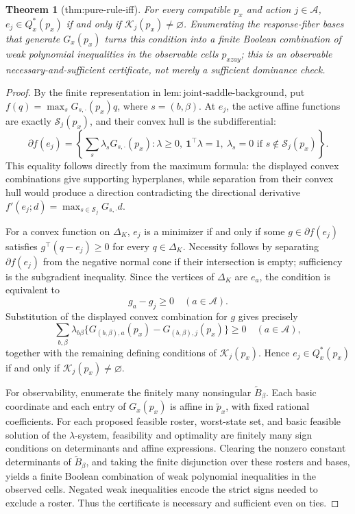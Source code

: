 \documentclass{article}
\newtheorem{theorem}{Theorem}
\begin{document}
\begin{theorem}[thm:pure-rule-iff]\label{thm:pure-rule-iff}
For every compatible \(p_x\) and action \(j\in\mathcal A\), \(e_j\in Q_x^*(p_x)\) if and only if \(\mathcal K_j(p_x)\neq\varnothing\). Enumerating the response-fiber bases that generate \(G_x(p_x)\) turns this condition into a finite Boolean combination of weak polynomial inequalities in the observable cells \(p_{xzay}\); this is an observable necessary-and-sufficient certificate, not merely a sufficient dominance check.
\end{theorem}
\begin{proof}
By the finite representation in \(\mathrm{lem{:}joint\text{-}saddle\text{-}background}\), put \(f(q)=\max_sG_{s,\cdot}(p_x)q\), where \(s=(b,\beta)\).  At \(e_j\), the active affine functions are exactly \(\mathcal S_j(p_x)\), and their convex hull is the subdifferential:
\[
 \partial f(e_j)=\left\{\sum_s\lambda_sG_{s,\cdot}(p_x):\lambda\geq0,\ \mathbf1^\top\lambda=1,\ \lambda_s=0\text{ if }s\notin\mathcal S_j(p_x)\right\}.
\]
This equality follows directly from the maximum formula: the displayed convex combinations give supporting hyperplanes, while separation from their convex hull would produce a direction contradicting the directional derivative \(f'(e_j;d)=\max_{s\in\mathcal S_j}G_{s,\cdot}d\).

For a convex function on \(\Delta_K\), \(e_j\) is a minimizer if and only if some \(g\in\partial f(e_j)\) satisfies \(g^\top(q-e_j)\geq0\) for every \(q\in\Delta_K\).  Necessity follows by separating \(\partial f(e_j)\) from the negative normal cone if their intersection is empty; sufficiency is the subgradient inequality.  Since the vertices of \(\Delta_K\) are \(e_a\), the condition is equivalent to
\[
 g_a-g_j\geq0\quad(a\in\mathcal A).
\]
Substitution of the displayed convex combination for \(g\) gives precisely
\[
 \sum_{b,\beta}\lambda_{b\beta}\{G_{(b,\beta),a}(p_x)-G_{(b,\beta),j}(p_x)\}\geq0
 \quad(a\in\mathcal A),
\]
together with the remaining defining conditions of \(\mathcal K_j(p_x)\).  Hence \(e_j\in Q_x^*(p_x)\) if and only if \(\mathcal K_j(p_x)\neq\varnothing\).

For observability, enumerate the finitely many nonsingular \(\widetilde B_\beta\).  Each basic coordinate and each entry of \(G_x(p_x)\) is affine in \(\widetilde p_x\), with fixed rational coefficients.  For each proposed feasible roster, worst-state set, and basic feasible solution of the \(\lambda\)-system, feasibility and optimality are finitely many sign conditions on determinants and affine expressions.  Clearing the nonzero constant determinants of \(\widetilde B_\beta\), and taking the finite disjunction over these rosters and bases, yields a finite Boolean combination of weak polynomial inequalities in the observed cells.  Negated weak inequalities encode the strict signs needed to exclude a roster.  Thus the certificate is necessary and sufficient even on ties.
\end{proof}
\end{document}
